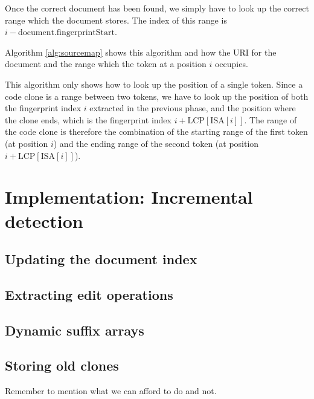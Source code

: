 Once the correct document has been found, we simply have to look up the correct range
which the document stores. The index of this range is $i -
\text{document.fingerprintStart}$.

Algorithm \ref{alg:sourcemap} shows this algorithm and how the URI for the document and
the range which the token at a position $i$ occupies.

This algorithm only shows how to look up the position of a single token. Since a code
clone is a range between two tokens, we have to look up the position of both the
fingerprint index $i$ extracted in the previous phase, and the position where the clone
ends, which is the fingerprint index $i + \text{LCP}[\text{ISA}[i]]$. The range of the
code clone is therefore the combination of the starting range of the first token (at
position $i$) and the ending range of the second token (at position $i +
\text{LCP}[\text{ISA}[i]]$).


\chapter{Implementation: Incremental detection}

\section{Updating the document index}

\section{Extracting edit operations}

\section{Dynamic suffix arrays}

\section{Storing old clones}


Remember to mention what we can afford to do and not.

